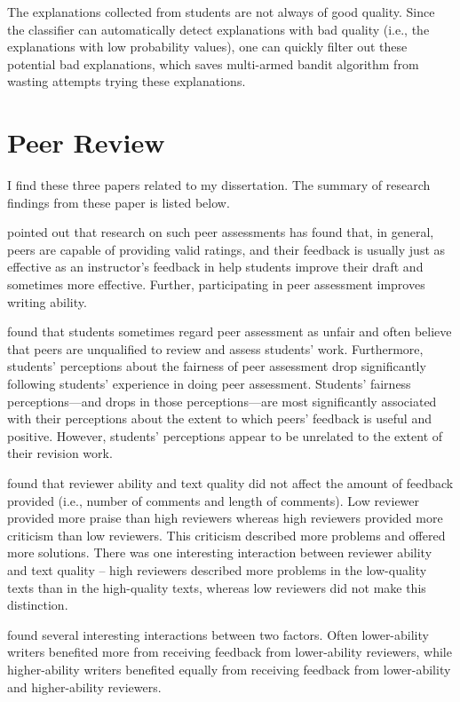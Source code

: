 \documentclass{article}
\begin{document}
The explanations collected from students are not always of good
quality. Since the classifier can automatically detect explanations
with bad quality (i.e., the explanations with low probability values),
one can quickly filter out these potential bad explanations, which saves multi-armed bandit algorithm from wasting attempts trying these explanations.

\section{Peer Review}
I find these three papers
\cite{patchan2016understanding,kaufman2011students,patchan2015understanding}
related to my dissertation. The summary of research findings from
these paper is listed below.

\cite{patchan2016understanding} pointed out that research on such peer assessments has found that, in general, peers
are capable of providing valid ratings, and their feedback is usually
just as effective as an instructor's feedback in help students improve
their draft and sometimes more effective. Further, participating in
peer assessment improves writing ability.

\cite{kaufman2011students} found that students
sometimes regard peer assessment as unfair and often believe that peers are
unqualified to review and assess students’ work. Furthermore, students’ perceptions about
the fairness of peer assessment drop significantly following students’ experience in doing
peer assessment. Students’ fairness perceptions—and drops in those perceptions—are most
significantly associated with their perceptions about the extent to which peers’ feedback is
useful and positive. However, students’ perceptions appear to be unrelated to the extent of
their revision work.

\cite{patchan2015understanding} found that reviewer ability and text quality did not affect the amount of
feedback provided (i.e., number of comments and length of
comments). Low reviewer provided more praise than high reviewers
whereas high reviewers provided more criticism than low
reviewers. This criticism described more problems and offered more
solutions. There was one interesting interaction between reviewer
ability and text quality -- high reviewers described more problems in
the low-quality texts than in the high-quality texts, whereas low
reviewers did not make this distinction.

\cite{patchan2016understanding} found several interesting interactions
between two factors. Often lower-ability writers benefited more from
receiving feedback from lower-ability reviewers, while higher-ability
writers benefited equally from receiving feedback from lower-ability
and higher-ability reviewers.
\end{document}

